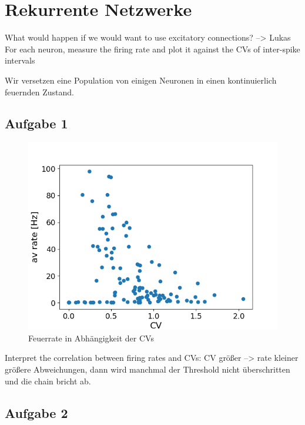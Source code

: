 \documentclass[10pt,a4paper]{scrartcl}
\begin{document}
\section{Rekurrente Netzwerke}
What would happen if we would want to use excitatory connections? --> Lukas
For each neuron, measure the firing rate and plot it against the
CVs of inter-spike intervals

Wir versetzen eine Population von einigen Neuronen in einen kontinuierlich feuernden Zustand. 

\subsection{Aufgabe 1}
\begin{figure} [ht]
\begin{center}
\label{fig:abb4}
\caption{Feuerrate in Abhängigkeit der CVs}
\includegraphics[scale=0.45]{pictures/decorr_rate_over_cv.png}
\end{center}
\end{figure}

Interpret the correlation between firing rates and CVs:
CV größer --> rate kleiner
größere Abweichungen, dann wird manchmal der Threshold nicht überschritten und die chain bricht ab.



\subsection{Aufgabe 2}
\end{document}
